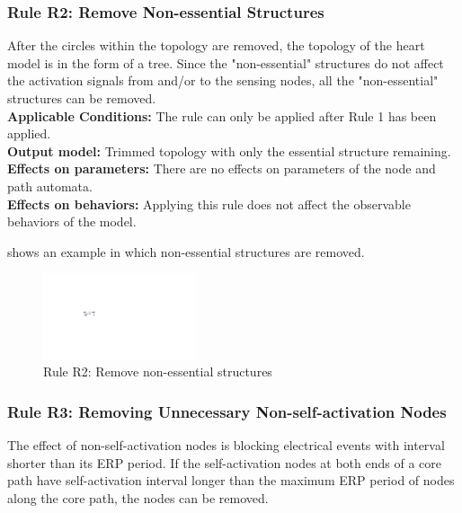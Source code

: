 \subsubsection{Rule R2: Remove Non-essential Structures}
After the circles within the topology are removed, the topology of the heart model is in the form of a tree. Since the "non-essential" structures do not affect the activation signals from and/or to the sensing nodes, all the "non-essential" structures can be removed.\\
\textbf{Applicable Conditions: }The rule can only be applied after Rule 1 has been applied.\\
\textbf{Output model: } Trimmed topology with only the essential structure remaining.\\
\textbf{Effects on parameters: } There are no effects on parameters of the node and path automata.\\
\textbf{Effects on behaviors: } Applying this rule does not affect the observable behaviors of the model.

 shows an example in which non-essential structures are removed.
\begin{figure}[!h]
	\centering
	\includegraphics[width=0.4\textwidth]{figs/rule2.pdf}
	\caption{\small Rule R2: Remove non-essential structures}
	\label{fig:rule2}
\end{figure}
\subsubsection{Rule R3: Removing Unnecessary Non-self-activation Nodes}
The effect of non-self-activation nodes is blocking electrical events with interval shorter than its ERP period. If the self-activation nodes at both ends of a core path have self-activation interval longer than the maximum ERP period of nodes along the core path, the nodes can be removed.

